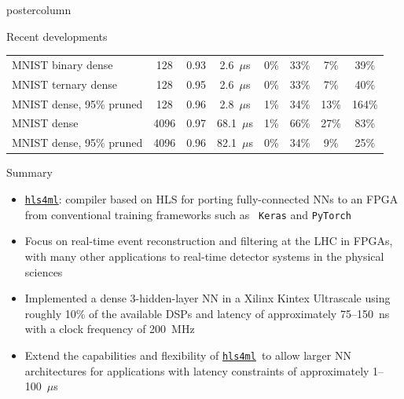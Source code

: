 \documentclass[final,hyperref={pdfpagelabels=false}]{beamer}
\newcommand{\hlsfml}{{\href{https://github.com/hls-fpga-machine-learning/hls4ml}{\texttt{hls4ml}}}}
\begin{document}
\begin{frame}
\begin{columns}
\begin{column}{.49\textwidth}
\begin{beamercolorbox}[center,wd=\textwidth]{postercolumn}
\begin{minipage}[T]{.95\textwidth}
{\begin{block}{Recent developments}
\begin{center}
{\begin{tabular}{l|ccccccc}
                        MNIST binary dense                                 &  128 & 0.93 & 2.6~$\mu$s & 0\% & 33\%& 7\% & 39\%\\ 
                        MNIST ternary dense                                &  128 & 0.95 & 2.6~$\mu$s & 0\% & 33\%& 7\% & 40\%\\ 
                        MNIST dense, 95\% pruned &  128 & 0.96 & 2.8~$\mu$s & 1\% & 34\% & 13\% & 164\%\\
                        MNIST dense                       &  4096 & 0.97 & 68.1~$\mu$s &1\% & 66\%&27\% &83\%\\ 
                        MNIST dense, 95\% pruned &  4096 & 0.96 & 82.1~$\mu$s & 0\% & 34\% & 9\% & 25\%\\ 
                      \end{tabular}}                       
                  \end{center}
                \end{block}                
                \begin{block}{Summary}
                  \begin{itemize}
                    \item \hlsfml: compiler based on HLS for porting
                      fully-connected NNs to an FPGA from
                      conventional training frameworks such as {\tt
                        Keras} and {\tt PyTorch}
                      \item Focus on real-time
                        event reconstruction and filtering at the LHC
                        in FPGAs, with many other applications to real-time detector systems in the physical
                        sciences 
                        \item  Implemented a dense 3-hidden-layer NN
                          in a Xilinx Kintex Ultrascale using roughly
                          10\% of the available DSPs and latency of
                          approximately 75--150~ns with a clock
                          frequency of 200~MHz 
                          \item Extend the capabilities and
                            flexibility of \hlsfml~to allow larger
                            NN architectures for applications with
                            latency constraints of approximately 1--100~$\mu$s 
                          \end{itemize}
                          \begin{flushright}\vspace{-3ex}

\end{flushright}
\end{block}}
\end{minipage}
\end{beamercolorbox}
\end{column}
\end{columns}
\end{frame}
\end{document}
